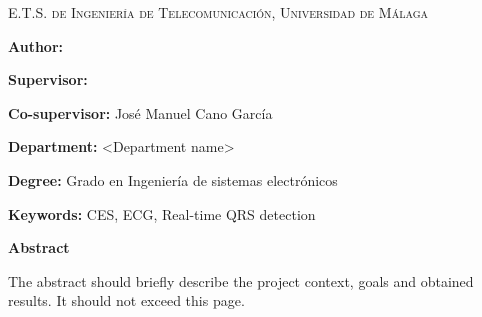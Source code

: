 
\pagestyle{fancy}

\begin{center}
	\scshape
	E.T.S. de Ingeniería de Telecomunicación, Universidad de Málaga
\end{center}

\bigskip

\begin{center}
	\Large \scshape
	\textbf{\tfgtitlenameENG}
\end{center}

\bigskip \bigskip \bigskip

\begin{minipage}{\textwidth}

\textbf{Author:} \tfgauthorname

\medskip

\textbf{Supervisor:} \tfgtutorname

\medskip

\textbf{Co-supervisor:} José Manuel Cano García

\medskip

\textbf{Department:} <Department name>

\medskip

\textbf{Degree:} Grado en Ingeniería de sistemas electrónicos

\medskip

\textbf{Keywords:} CES, ECG, Real-time QRS detection

\bigskip \bigskip


\end{minipage}

\begin{center}
	\textbf{Abstract}
\end{center}

The abstract should briefly describe the project context, goals and
obtained results. It should not exceed this page.

\blankpage
